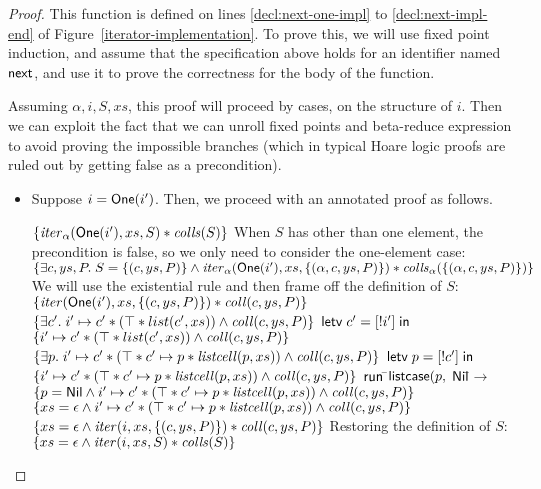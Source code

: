 \begin{proof}
This function is defined on lines \ref{decl:next-one-impl} to \ref{decl:next-impl-end} 
of Figure~\ref{iterator-implementation}. To prove this, we will use fixed point induction,
and assume that the specification above holds for an identifier named $\mathsf{next}$, and
use it to prove the correctness for the body of the function. 

Assuming $\alpha, i, S, xs$, this proof will proceed by cases, on
the structure of $i$. Then we can exploit the fact that we can unroll fixed
points and beta-reduce expression to avoid proving the impossible branches (which
in typical Hoare logic proofs are ruled out by getting false as a precondition). 

\begin{itemize}
\item Suppose $i = \mathsf{One}(i')$. Then, we proceed with an annotated proof as 
follows.  
\begin{specification}
\nextline $\{{\mathit{iter}_\alpha(\mathsf{One}(i'), xs, S) * \mathit{colls}(S)}\}$ 
\nextline When $S$ has other than one element, the precondition is false, so we only need to \nextline
          consider the one-element case:
\nextline $\{{\exists c, ys, P.\; S = \{{(c, ys, P)}\} \land \mathit{iter}_\alpha(\mathsf{One}(i'), xs, \{{(\alpha, c, ys, P)}\}) * \mathit{colls}_\alpha(\{{(\alpha, c, ys, P)}\})}\}$ 
\nextline We will use the existential rule and then frame off the definition of $S$:
\nextline $\{{\mathit{iter}(\mathsf{One}(i'), xs, \{{(c, ys, P)}\}) * \mathit{coll}(c, ys, P)}\}$ 
\nextline $\{{\exists c'.\; i' \mapsto c' * (\top * list(c', xs)) \land \mathit{coll}(c, ys, P)}\}$
\nextline $\mathsf{letv}\;c' = [!i']\;\mathsf{in}\;$ 
\nextline $\{{i' \mapsto c' * (\top * list(c', xs)) \land \mathit{coll}(c, ys, P)}\}$
\nextline $\{{\exists p.\; i' \mapsto c' * (\top * c' \mapsto p * \mathit{listcell}(p, xs)) \land \mathit{coll}(c, ys, P)}\}$
\nextline $\mathsf{letv}\;p = [!c']\;\mathsf{in}\;$ 
\nextline $\{{i' \mapsto c' * (\top * c' \mapsto p * \mathit{listcell}(p, xs)) \land \mathit{coll}(c, ys, P)}\}$
\nextline $\mathsf{run}\;$\=$\mathsf{listcase}(p,$ 
\nextline \> $\mathsf{Nil} $\=$\to$ 
\nextline \> \> $\{{p = \mathsf{Nil} \land i' \mapsto c' * (\top * c' \mapsto p * \mathit{listcell}(p, xs)) \land \mathit{coll}(c, ys, P)}\}$
\nextline \> \> $\{{xs = \epsilon \land i' \mapsto c' * (\top * c' \mapsto p * \mathit{listcell}(p, xs)) \land \mathit{coll}(c, ys, P)}\}$
\nextline \> \> $\{{xs = \epsilon \land \mathit{iter}(i, xs, \{{(c, ys, P)}\}) * \mathit{coll}(c, ys, P)}\}$
\nextline \> \> Restoring the definition of $S$:
\nextline \> \> $\{{xs = \epsilon \land \mathit{iter}(i, xs, S) * \mathit{colls}(S)}\}$

\end{specification}
\end{itemize}
\end{proof}
